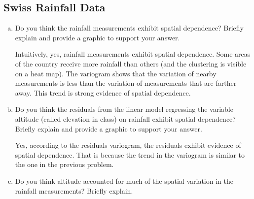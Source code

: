 \documentclass[letterpaper, 12pt]{article}
\begin{document}
\subsection*{Swiss Rainfall Data}
\begin{enumerate}[a.]
\item
Do you think the rainfall measurements exhibit spatial dependence? Briefly explain and provide a graphic to support your answer.

\textsf{
Intuitively, yes, rainfall measurements exhibit spatial dependence. Some areas of the country receive more rainfall than others (and the clustering is visible on a heat map). The variogram shows that the variation of nearby measurements is less than the variation of measurements that are farther away. This trend is strong evidence of spatial dependence.
}
\item
Do you think the residuals from the linear model regressing the variable altitude (called elevation in class) on rainfall exhibit spatial dependence? Briefly explain and provide a graphic to support your answer.

\textsf{
Yes, according to the residuals variogram, the residuals exhibit evidence of spatial dependence. That is because the trend in the variogram is similar to the one in the previous problem. 
}
\item
Do you think altitude accounted for much of the spatial variation in the rainfall measurements? Briefly explain.


\end{enumerate}
\end{document}
